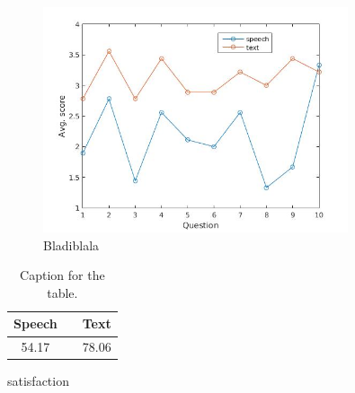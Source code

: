 \begin{figure}[p]
  \centering
  \includegraphics[width=0.8\textwidth]{images/sus.jpg}
  \caption{Bladiblala}\label{sus_table}
\end{figure}

\begin{table}[h!]
  \centering
  \begin{tabular}{ccc}
    \toprule
    Speech &   & Text\\
    \midrule
    54.17 &   & 78.06\\
    \bottomrule
  \end{tabular}
  \caption{Caption for the table.}\label{tot_score}
\end{table}

satisfaction